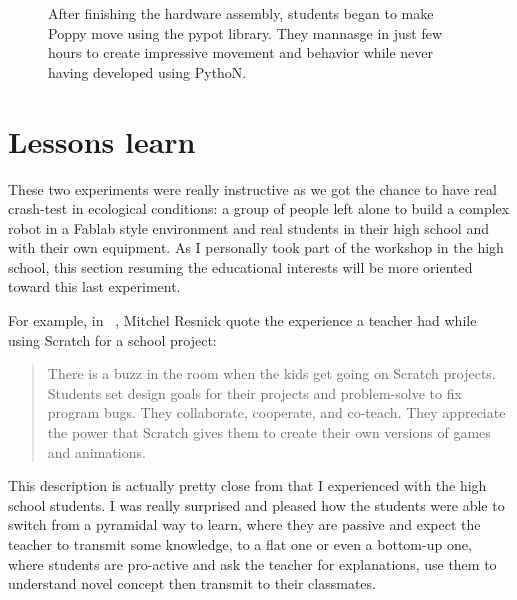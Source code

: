 
\begin{figure}[]
\centering
    \hfil
    \caption{After finishing the hardware assembly, students began to make Poppy move using the pypot library. They mannasge in just few hours to create impressive movement and behavior while never having developed using PythoN.}
    \label{fig:saintonge_demonstration}
\end{figure}



\section{Lessons learn} %

These two experiments were really instructive as we got the chance to have real crash-test in ecological conditions: a group of people left alone to build a complex robot in a Fablab style environment and real students in their high school and with their own equipment. As I personally took part of the workshop in the high school, this section resuming the educational interests will be more oriented toward this last experiment.

For example, in ~\cite{resnick2008sowing}, Mitchel Resnick quote the experience a teacher had while using Scratch for a school project:
\begin{quotation}
    There is a buzz in the room when the kids get going on Scratch projects. Students set design goals for their projects and problem-solve to fix program bugs. They collaborate, cooperate, and co-teach. They appreciate the power that Scratch gives them to create their own versions of games and animations.

\end{quotation}

This description is actually pretty close from that I experienced with the high school students. I was really surprised and pleased how the students were able to switch from a pyramidal way to learn, where they are passive and expect the teacher to transmit some knowledge, to a flat one or even a bottom-up one, where students are pro-active and ask the teacher for explanations, use them to understand novel concept then transmit to their classmates.

